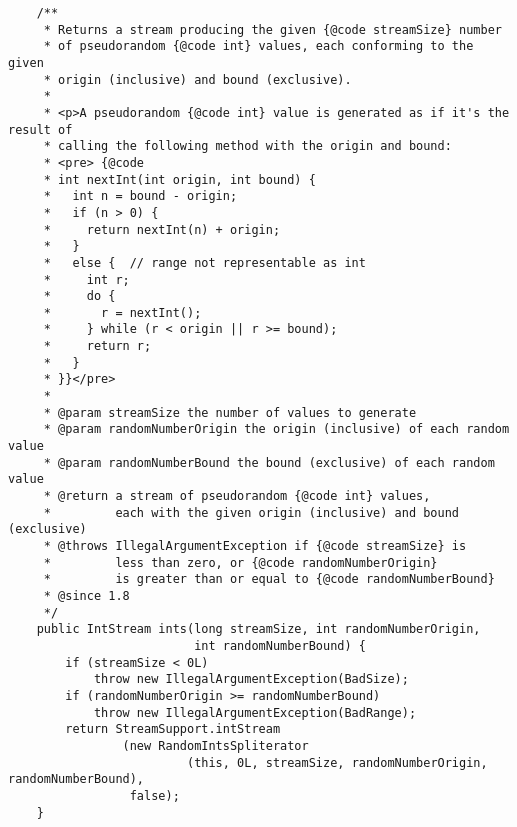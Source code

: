 \documentclass[12pt,a4paper,twoside,openright,titlepage,final]{article}
\begin{document}
\begin{verbatim}
    /**
     * Returns a stream producing the given {@code streamSize} number
     * of pseudorandom {@code int} values, each conforming to the given
     * origin (inclusive) and bound (exclusive).
     *
     * <p>A pseudorandom {@code int} value is generated as if it's the result of
     * calling the following method with the origin and bound:
     * <pre> {@code
     * int nextInt(int origin, int bound) {
     *   int n = bound - origin;
     *   if (n > 0) {
     *     return nextInt(n) + origin;
     *   }
     *   else {  // range not representable as int
     *     int r;
     *     do {
     *       r = nextInt();
     *     } while (r < origin || r >= bound);
     *     return r;
     *   }
     * }}</pre>
     *
     * @param streamSize the number of values to generate
     * @param randomNumberOrigin the origin (inclusive) of each random value
     * @param randomNumberBound the bound (exclusive) of each random value
     * @return a stream of pseudorandom {@code int} values,
     *         each with the given origin (inclusive) and bound (exclusive)
     * @throws IllegalArgumentException if {@code streamSize} is
     *         less than zero, or {@code randomNumberOrigin}
     *         is greater than or equal to {@code randomNumberBound}
     * @since 1.8
     */
    public IntStream ints(long streamSize, int randomNumberOrigin,
                          int randomNumberBound) {
        if (streamSize < 0L)
            throw new IllegalArgumentException(BadSize);
        if (randomNumberOrigin >= randomNumberBound)
            throw new IllegalArgumentException(BadRange);
        return StreamSupport.intStream
                (new RandomIntsSpliterator
                         (this, 0L, streamSize, randomNumberOrigin, randomNumberBound),
                 false);
    }


\end{verbatim}
\end{document}
